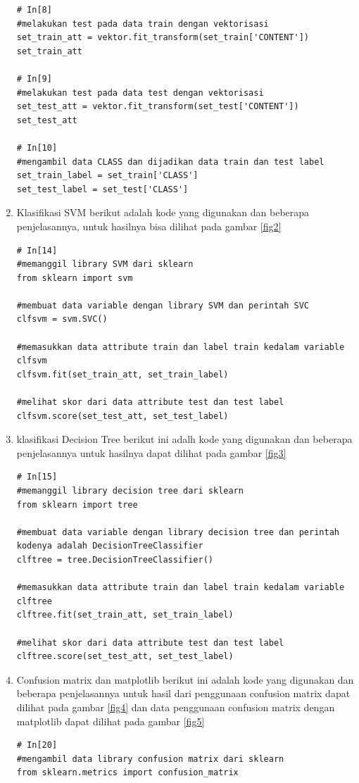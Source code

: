 \begin{enumerate}
\begin{verbatim}
# In[8]
#melakukan test pada data train dengan vektorisasi
set_train_att = vektor.fit_transform(set_train['CONTENT'])
set_train_att

# In[9]
#melakukan test pada data test dengan vektorisasi
set_test_att = vektor.fit_transform(set_test['CONTENT'])
set_test_att

# In[10]
#mengambil data CLASS dan dijadikan data train dan test label
set_train_label = set_train['CLASS']
set_test_label = set_test['CLASS']
\end{verbatim}

\item Klasifikasi SVM
\subitem berikut adalah kode yang digunakan dan beberapa penjelasannya, untuk hasilnya bisa dilihat pada gambar \ref{fig2}
\begin{verbatim}
# In[14]
#memanggil library SVM dari sklearn
from sklearn import svm

#membuat data variable dengan library SVM dan perintah SVC
clfsvm = svm.SVC()

#memasukkan data attribute train dan label train kedalam variable clfsvm
clfsvm.fit(set_train_att, set_train_label)

#melihat skor dari data attribute test dan test label
clfsvm.score(set_test_att, set_test_label)
\end{verbatim}

\item klasifikasi Decision Tree 
\subitem berikut ini adalh kode yang digunakan dan beberapa penjelasannya untuk hasilnya dapat dilihat pada gambar \ref{fig3}
\begin{verbatim}
# In[15]
#memanggil library decision tree dari sklearn
from sklearn import tree

#membuat data variable dengan library decision tree dan perintah kodenya adalah DecisionTreeClassifier
clftree = tree.DecisionTreeClassifier()

#memasukkan data attribute train dan label train kedalam variable clftree
clftree.fit(set_train_att, set_train_label)

#melihat skor dari data attribute test dan test label
clftree.score(set_test_att, set_test_label)
\end{verbatim}

\item Confusion matrix dan matplotlib
\subitem berikut ini adalah kode yang digunakan dan beberapa penjelasannya untuk hasil dari penggunaan confusion matrix dapat dilihat pada gambar \ref{fig4} dan data penggunaan confusion matrix dengan matplotlib dapat dilihat pada gambar \ref{fig5}
\begin{verbatim}
# In[20]
#mengambil data library confusion matrix dari sklearn
from sklearn.metrics import confusion_matrix


\end{verbatim}
\end{enumerate}
